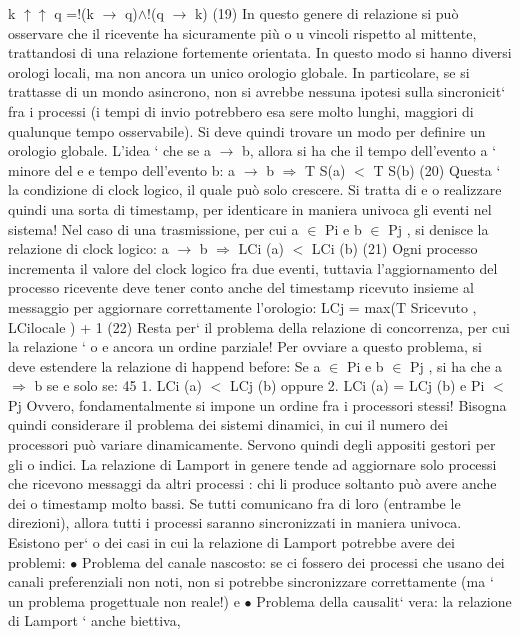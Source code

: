 \documentclass[a4paper,12pt]{article}
\begin{document}
k $\uparrow$$\uparrow$ q =!(k $\rightarrow$ q)$\land$!(q $\rightarrow$ k)
(19)
In questo genere di relazione si può osservare che il ricevente ha sicuramente più
o
u
vincoli rispetto al mittente, trattandosi di una relazione fortemente orientata.
In questo modo si hanno diversi orologi locali, ma non ancora un unico orologio globale. In particolare, se si trattasse
di un mondo asincrono, non si avrebbe
nessuna ipotesi sulla sincronicit` fra i processi (i tempi di invio potrebbero esa
sere molto lunghi, maggiori di qualunque tempo osservabile). Si deve quindi
trovare un modo per definire un orologio globale.
L'idea ` che se a $\rightarrow$ b, allora si ha che il tempo dell'evento a ` minore del
e
e
tempo dell'evento b:
a $\rightarrow$ b $\Rightarrow$ T S(a) $<$ T S(b)
(20)
Questa ` la condizione di clock logico, il quale può solo crescere. Si tratta di
e
o
realizzare quindi una sorta di timestamp, per identicare in maniera univoca gli
eventi nel sistema!
Nel caso di una trasmissione, per cui a $\in$ Pi e b $\in$ Pj , si denisce la relazione
di clock logico:
a $\rightarrow$ b $\Rightarrow$ LCi (a) $<$ LCi (b)
(21)
Ogni processo incrementa il valore del clock logico fra due eventi, tuttavia
l'aggiornamento del processo ricevente deve tener conto anche del timestamp
ricevuto insieme al messaggio per aggiornare correttamente l'orologio:
LCj = max(T Sricevuto , LCilocale ) + 1
(22)
Resta per` il problema della relazione di concorrenza, per cui la relazione `
o
e
ancora un ordine parziale! Per ovviare a questo problema, si deve estendere la
relazione di happend before:
Se a $\in$ Pi e b $\in$ Pj , si ha che a $\Rightarrow$ b se e solo se:
45
1. LCi (a) $<$ LCj (b) oppure
2. LCi (a) = LCj (b) e Pi $<$ Pj
Ovvero, fondamentalmente si impone un ordine fra i processori stessi! Bisogna
quindi considerare il problema dei sistemi dinamici, in cui il numero dei processori può variare dinamicamente. Servono
quindi degli appositi gestori per gli
o
indici.
La relazione di Lamport in genere tende ad aggiornare solo processi che
ricevono messaggi da altri processi : chi li produce soltanto può avere anche dei
o
timestamp molto bassi. Se tutti comunicano fra di loro (entrambe le direzioni),
allora tutti i processi saranno sincronizzati in maniera univoca. Esistono per`
o
dei casi in cui la relazione di Lamport potrebbe avere dei problemi:
$\bullet$ Problema del canale nascosto: se ci fossero dei processi che usano dei
canali preferenziali non noti, non si potrebbe sincronizzare correttamente
(ma ` un problema progettuale non reale!)
e
$\bullet$ Problema della causalit` vera: la relazione di Lamport ` anche biettiva,
$$
\end{document}
